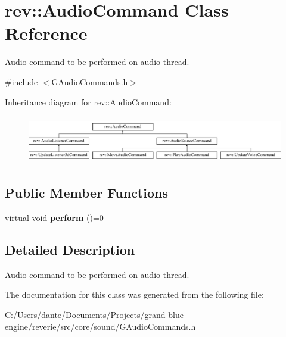 \hypertarget{classrev_1_1_audio_command}{}\section{rev\+::Audio\+Command Class Reference}
\label{classrev_1_1_audio_command}


Audio command to be performed on audio thread.  




{\ttfamily \#include $<$G\+Audio\+Commands.\+h$>$}

Inheritance diagram for rev\+::Audio\+Command\+:\begin{figure}[H]
\begin{center}
\leavevmode
\includegraphics[height=2.121212cm]{classrev_1_1_audio_command}
\end{center}
\end{figure}
\subsection*{Public Member Functions}
\begin{DoxyCompactItemize}
\item 
\mbox{\label{classrev_1_1_audio_command_a178f19e74dffa795be81ace8382598f0}} 
virtual void {\bfseries perform} ()=0
\end{DoxyCompactItemize}


\subsection{Detailed Description}
Audio command to be performed on audio thread. 

The documentation for this class was generated from the following file\+:\begin{DoxyCompactItemize}
\item 
C\+:/\+Users/dante/\+Documents/\+Projects/grand-\/blue-\/engine/reverie/src/core/sound/G\+Audio\+Commands.\+h\end{DoxyCompactItemize}
